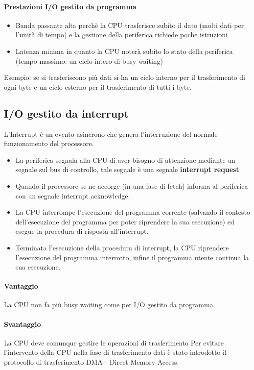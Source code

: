 \documentclass[12pt, a4paper, openany]{book}
\begin{document}
\paragraph*{Prestazioni I/O gestito da programma}
\begin{itemize}
    \item Banda passante alta perchè la CPU trasferisce subito il dato (molti dati per l'unità
    di tempo) e la gestione della periferica richiede poche istruzioni
    \item Latenza minima in quanto la CPU noterà subito lo stato della periferica (tempo massimo:
    un ciclo intero di busy waiting)
\end{itemize}
Esempio: se si trasferiscono più dati si ha un ciclo interno per il trasferimento di ogni byte 
e un ciclo esterno per il trasferimento di tutti i byte.

\subsection*{I/O gestito da interrupt}
L'Interrupt è un evento asincrono che genera l'interruzione del normale funzionamento del processore.
\begin{itemize}
    \item La periferica segnala alla CPU di aver bisogno di attenzione mediante un segnale sul bus di controllo,
    tale segnale è una segnale \textbf{interrupt request}
    \item Quando il processore se ne accorge (in una fase di fetch) informa al periferica con un segnale 
    interrupt acknowledge. 
    \item La CPU interrompe l'esecuzione del programma corrente (salvando il contesto dell'esecuzione del programma per poter 
    riprendere la sua esecuzione) ed esegue la procedura di risposta all'interrupt.
    \item Terminata l'esecuzione della procedura di interrupt, la CPU riprendere l'esecuzione del programma
    interrotto, infine il programma utente continua la sua esecuzione.
\end{itemize}

\paragraph*{Vantaggio} La CPU non fa più busy waiting come per I/O gestito da programma
\paragraph*{Svantaggio} La CPU deve comunque gestire le operazioni di trasferimento
Per evitare l'intervento della CPU nella fase di trasferimento dati è stato introdotto il protocollo di trasferimento
DMA - Direct Memory Access.
\end{document}
